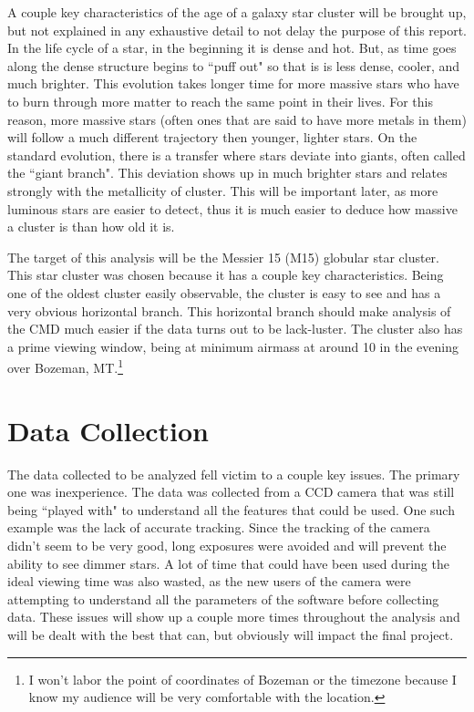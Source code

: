 \documentclass[twoside,11pt]{article}
\begin{document}
A couple key characteristics of the age of a galaxy star cluster will be brought up, but not explained in any exhaustive detail to not delay the purpose of this report. In the life cycle of a star, in the beginning it is dense and hot. But, as time goes along the dense structure begins to ``puff out" so that is is less dense, cooler, and much brighter. This evolution takes longer time for more massive stars who have to burn through more matter to reach the same point in their lives. For this reason, more massive stars (often ones that are said to have more metals in them) will follow a much different trajectory then younger, lighter stars. On the standard evolution, there is a transfer where stars deviate into giants, often called the ``giant branch". This deviation shows up in much brighter stars and relates strongly with the metallicity of cluster. This will be important later, as more luminous stars are easier to detect, thus it is much easier to deduce how massive a cluster is than how old it is. 

The target of this analysis will be the Messier 15 (M15) globular star cluster. This star cluster was chosen because it has a couple key characteristics. Being one of the oldest cluster easily observable, the cluster is easy to see and has a very obvious horizontal branch. This horizontal branch should make analysis of the CMD much easier if the data turns out to be lack-luster. The cluster also has a prime viewing window, being at minimum airmass at around 10 in the evening over Bozeman, MT.\footnote{I won't labor the point of coordinates of Bozeman or the timezone because I know my audience will be very comfortable with the location.} 

\section{Data Collection}
The data collected to be analyzed fell victim to a couple key issues. The primary one was inexperience. The data was collected from a CCD camera that was still being ``played with" to understand all the features that could be used. One such example was the lack of accurate tracking. Since the tracking of the camera didn't seem to be very good, long exposures were avoided and will prevent the ability to see dimmer stars. A lot of time that could have been used during the ideal viewing time was also wasted, as the new users of the camera were attempting to understand all the parameters of the software before collecting data. These issues will show up a couple more times throughout the analysis and will be dealt with the best that can, but obviously will impact the final project.
\end{document}
